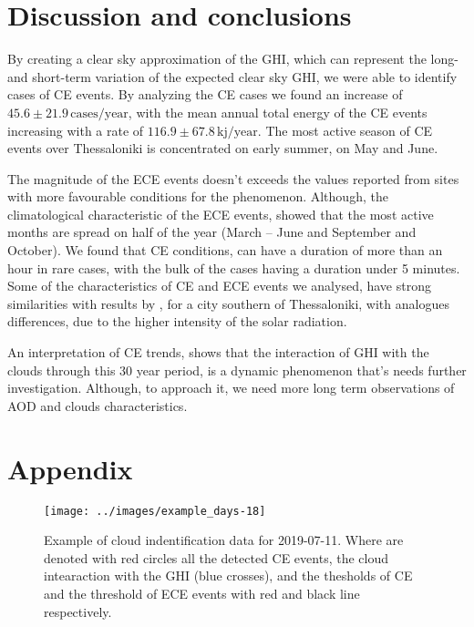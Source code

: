 \documentclass[preprint, 3p,
authoryear]{elsarticle} %
\begin{document}
\hypertarget{discussion-and-conclusions}{%
\section{Discussion and conclusions}\label{discussion-and-conclusions}}

By creating a clear sky approximation of the GHI, which can represent
the long- and short-term variation of the expected clear sky GHI, we
were able to identify cases of CE events. By analyzing the CE cases we
found an increase of \(45.6\pm 21.9\,\text{cases}/\text{year}\), with
the mean annual total energy of the CE events increasing with a rate of
\(116.9\pm 67.8\,\text{kj}/\text{year}\). The most active season of CE
events over Thessaloniki is concentrated on early summer, on May and
June.

The magnitude of the ECE events doesn't exceeds the values reported from
sites with more favourable conditions for the phenomenon. Although, the
climatological characteristic of the ECE events, showed that the most
active months are spread on half of the year (March -- June and
September and October). We found that CE conditions, can have a duration
of more than an hour in rare cases, with the bulk of the cases having a
duration under 5 minutes. Some of the characteristics of CE and ECE
events we analysed, have strong similarities with results by
\citet{Vamvakas2020}, for a city southern of Thessaloniki, with
analogues differences, due to the higher intensity of the solar
radiation.

An interpretation of CE trends, shows that the interaction of GHI with
the clouds through this 30 year period, is a dynamic phenomenon that's
needs further investigation. Although, to approach it, we need more long
term observations of AOD and clouds characteristics.

\hypertarget{appendix}{%
\section*{Appendix}\label{appendix}}

\begin{figure}

{\centering \texttt{[image: ../images/example\_days-18]} 

}

\caption{Example of cloud indentification data for 2019-07-11. Where are denoted with red circles all the detected CE events, the cloud intearaction with the GHI (blue crosses), and the thesholds of CE and the threshold of ECE events with red and black line respectively.}\label{fig:example-day}
\end{figure}
\end{document}
